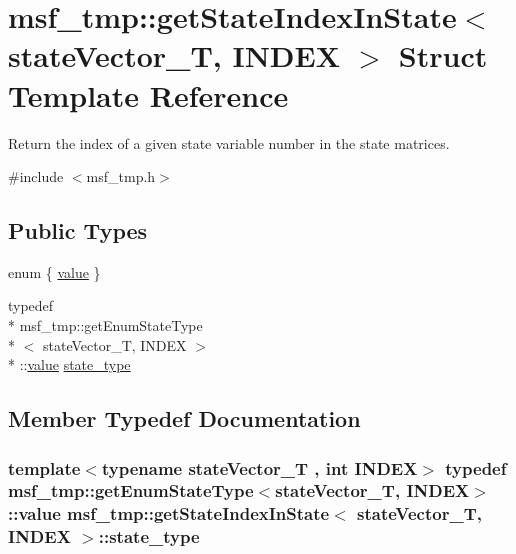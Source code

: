 \hypertarget{structmsf__tmp_1_1getStateIndexInState}{\section{msf\-\_\-tmp\-:\-:get\-State\-Index\-In\-State$<$ state\-Vector\-\_\-\-T, I\-N\-D\-E\-X $>$ Struct Template Reference}
\label{structmsf__tmp_1_1getStateIndexInState}
}


Return the index of a given state variable number in the state matrices.  




{\ttfamily \#include $<$msf\-\_\-tmp.\-h$>$}

\subsection*{Public Types}
\begin{DoxyCompactItemize}
\item 
enum \{ \hyperlink{structmsf__tmp_1_1getStateIndexInState_ad7b69910b085902a0f1649a3c56010d1ada55cb978166c5c7a3b92d656e532efb}{value}
 \}
\item 
typedef \\*
msf\-\_\-tmp\-::get\-Enum\-State\-Type\\*
$<$ state\-Vector\-\_\-\-T, I\-N\-D\-E\-X $>$\\*
\-::\hyperlink{structmsf__tmp_1_1getStateIndexInState_ad7b69910b085902a0f1649a3c56010d1ada55cb978166c5c7a3b92d656e532efb}{value} \hyperlink{structmsf__tmp_1_1getStateIndexInState_a07ac7bf8d85ca0fa2f6f8313c8110820}{state\-\_\-type}
\end{DoxyCompactItemize}


\subsection{Member Typedef Documentation}
\hypertarget{structmsf__tmp_1_1getStateIndexInState_a07ac7bf8d85ca0fa2f6f8313c8110820}{
\subsubsection[{state\-\_\-type}]{\setlength{\rightskip}{0pt plus 5cm}template$<$typename state\-Vector\-\_\-\-T , int I\-N\-D\-E\-X$>$ typedef msf\-\_\-tmp\-::get\-Enum\-State\-Type$<$state\-Vector\-\_\-\-T, I\-N\-D\-E\-X$>$\-::{\bf value} {\bf msf\-\_\-tmp\-::get\-State\-Index\-In\-State}$<$ state\-Vector\-\_\-\-T, I\-N\-D\-E\-X $>$\-::{\bf state\-\_\-type}}}\label{structmsf__tmp_1_1getStateIndexInState_a07ac7bf8d85ca0fa2f6f8313c8110820}


